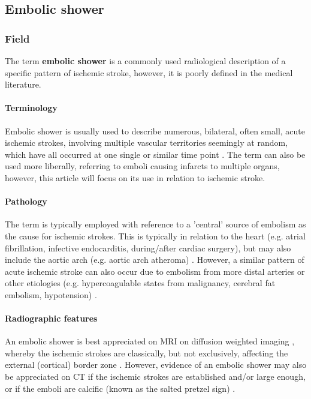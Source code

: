 \subsection{Embolic shower}

\subsubsection{Field}

The term \textbf{embolic shower} is a commonly used radiological description of a specific pattern of ischemic stroke, however, it is poorly defined in the medical literature.

\paragraph{Terminology}

Embolic shower is usually used to describe numerous, bilateral, often small, acute ischemic strokes, involving multiple vascular territories seemingly at random, which have all occurred at one single or similar time point . The term can also be used more liberally, referring to emboli causing infarcts to multiple organs, however, this article will focus on its use in relation to ischemic stroke.

\paragraph{Pathology}

The term is typically employed with reference to a 'central' source of embolism as the cause for ischemic strokes. This is typically in relation to the heart (e.g. atrial fibrillation, infective endocarditis, during/after cardiac surgery), but may also include the aortic arch (e.g. aortic arch atheroma) . However, a similar pattern of acute ischemic stroke can also occur due to embolism from more distal arteries or other etiologies (e.g. hypercoagulable states from malignancy, cerebral fat embolism, hypotension) .

\paragraph{Radiographic features}

An embolic shower is best appreciated on MRI on diffusion weighted imaging , whereby the ischemic strokes are classically, but not exclusively, affecting the external (cortical) border zone . However, evidence of an embolic shower may also be appreciated on CT if the ischemic strokes are established and/or large enough, or if the emboli are calcific (known as the salted pretzel sign) .

